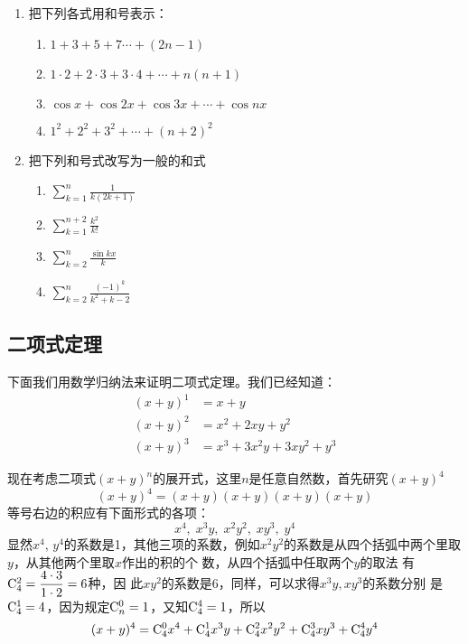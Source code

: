 \begin{ex}
\begin{enumerate}
    \item 把下列各式用和号表示：
\begin{enumerate}[(1)]
\item $1+3+5+7\cdots+(2n-1)$ 
\item $1\cdot2+2\cdot3+3\cdot4+\cdots+n(n+1)$ 
\item $\cos x+\cos2x+\cos3x+\cdots+\cos nx$
\item $1^{2}+2^{2}+3^{2}+\cdots+(n+2)^{2}$
\end{enumerate}

\item 把下列和号式改写为一般的和式
\begin{multicols}{2}
\begin{enumerate}[(1)]
\item $\sum\limits _{k= 1}^{n}\frac 1{k( 2k+ 1) }$ 
\item $\sum\limits _{k= 1}^{n+ 2}\frac {k^{2}}{k! }$
\item $\sum\limits^n_{k=2}\frac{\sin kx}{k}$
\item $\sum\limits^n_{k=2}\frac{(-1)^k}{k^2+k-2}$
\end{enumerate}
\end{multicols}
\end{enumerate}
\end{ex}

\subsection{二项式定理}
下面我们用数学归纳法来证明二项式定理。我们已经知道：
\[\begin{split}
(x+y)^1&=x+y\\
(x+y)^2&=x^2+2xy+y^2\\
(x+y)^3&=x^3+3x^2y+3xy^2+y^3    
\end{split}\]

现在考虑二项式$(x+y)^n$的展开式，这里$n$是任意自然数，首先研究$(x+y)^4$
\[(x+y)^4=(x+y)(x+y)(x+y)(x+y)\]
等号右边的积应有下面形式的各项：
\[x^4,\; x^3y,\; x^2y^2,\; xy^3,\; y^4\]
显然$x^4$, $y^4$的系数是1，其他三项的系数，例如$x^2y^2$的系数是从四个括弧中两个里取$y$，从其他两个里取$x$作出的积的个
数，从四个括弧中任取两个$y$的取法 有${\rm C}^{2}_{4}=\dfrac{4\cdot 3}{1\cdot 2}=6$种，因
此$xy^2$的系数是6，同样，可以求得$x^3y,xy^3$的系数分别
是${\rm C}^{1}_{4}=4$，因为规定${\rm C}^{0}_{n}=1$，又知${\rm C}^{4}_{4}=1$，所以
\[(x+y)^4={\rm C}^{0}_{4}x^4+{\rm C}^{1}_{4}x^3y+{\rm C}^{2}_{4}x^2y^2+{\rm C}^{3}_{4}xy^3+{\rm C}^{4}_{4}y^4\]

